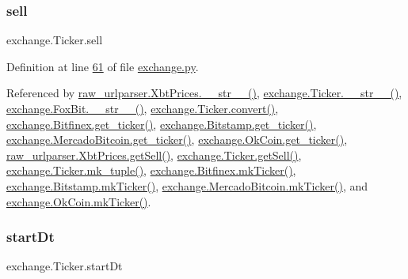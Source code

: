 \mbox{\label{classexchange_1_1_ticker_a5ba9e257d2ed28f02528a37d9ebd793e}} 
\subsubsection{\texorpdfstring{sell}{sell}}
{\footnotesize\ttfamily exchange.\+Ticker.\+sell}



Definition at line \hyperlink{exchange_8py_source_l00061}{61} of file \hyperlink{exchange_8py_source}{exchange.\+py}.



Referenced by \hyperlink{raw__urlparser_8py_source_l00074}{raw\+\_\+urlparser.\+Xbt\+Prices.\+\_\+\+\_\+str\+\_\+\+\_\+()}, \hyperlink{exchange_8py_source_l00136}{exchange.\+Ticker.\+\_\+\+\_\+str\+\_\+\+\_\+()}, \hyperlink{exchange_8py_source_l00610}{exchange.\+Fox\+Bit.\+\_\+\+\_\+str\+\_\+\+\_\+()}, \hyperlink{exchange_8py_source_l00069}{exchange.\+Ticker.\+convert()}, \hyperlink{exchange_8py_source_l00439}{exchange.\+Bitfinex.\+get\+\_\+ticker()}, \hyperlink{exchange_8py_source_l00511}{exchange.\+Bitstamp.\+get\+\_\+ticker()}, \hyperlink{exchange_8py_source_l00651}{exchange.\+Mercado\+Bitcoin.\+get\+\_\+ticker()}, \hyperlink{exchange_8py_source_l00716}{exchange.\+Ok\+Coin.\+get\+\_\+ticker()}, \hyperlink{raw__urlparser_8py_source_l00065}{raw\+\_\+urlparser.\+Xbt\+Prices.\+get\+Sell()}, \hyperlink{exchange_8py_source_l00103}{exchange.\+Ticker.\+get\+Sell()}, \hyperlink{exchange_8py_source_l00121}{exchange.\+Ticker.\+mk\+\_\+tuple()}, \hyperlink{exchange_8py_source_l00453}{exchange.\+Bitfinex.\+mk\+Ticker()}, \hyperlink{exchange_8py_source_l00525}{exchange.\+Bitstamp.\+mk\+Ticker()}, \hyperlink{exchange_8py_source_l00665}{exchange.\+Mercado\+Bitcoin.\+mk\+Ticker()}, and \hyperlink{exchange_8py_source_l00730}{exchange.\+Ok\+Coin.\+mk\+Ticker()}.

\mbox{\label{classexchange_1_1_ticker_a543696a29fac37ff29a3f6ef25cccd12}} 
\subsubsection{\texorpdfstring{start\+Dt}{startDt}}
{\footnotesize\ttfamily exchange.\+Ticker.\+start\+Dt}



